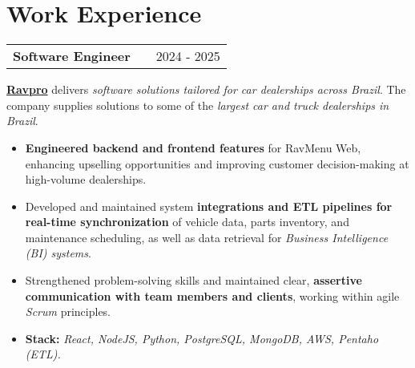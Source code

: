 \documentclass[a4paper,12pt]{article}
\makeatletter
\newenvironment{joblong}[2]
{
    \begin{tabularx}{\linewidth}{@{}l X r@{}}
        \textbf{#1} & \hfill & #2 \\[3.75pt]
    \end{tabularx}
    \begin{minipage}[t]{\linewidth}
    }
    {
    \end{minipage}
}
\newenvironment{bullets}
{
    \begin{itemize}[nosep,after=\strut, leftmargin=1em, itemsep=3pt,label=--]
    }
    {
    \end{itemize}
}
\makeatother
\begin{document}


    \section{Work Experience}


    \begin{joblong}{Software Engineer}{2024 - 2025}
        \href{https://ravpro.com.br}{\textbf{Ravpro}} delivers \textit{software solutions tailored for car dealerships across Brazil}. The company supplies solutions to some of the \textit{largest car and truck dealerships in Brazil}.
        \begin{bullets}
            \item \textbf{Engineered backend and frontend features} for RavMenu Web, enhancing upselling opportunities and improving customer decision-making at high-volume dealerships.
            \item Developed and maintained system \textbf{integrations and ETL pipelines for real-time synchronization} of vehicle data, parts inventory, and maintenance scheduling,
            as well as data retrieval for \textit{Business Intelligence (BI) systems}.
            \item Strengthened problem-solving skills and maintained clear, \textbf{assertive communication with team members and clients}, working within agile \textit{Scrum} principles.
            \item \textbf{Stack:} \textit{React, NodeJS, Python, PostgreSQL, MongoDB, AWS, Pentaho (ETL).}
        \end{bullets}
    \end{joblong}
\end{document}
